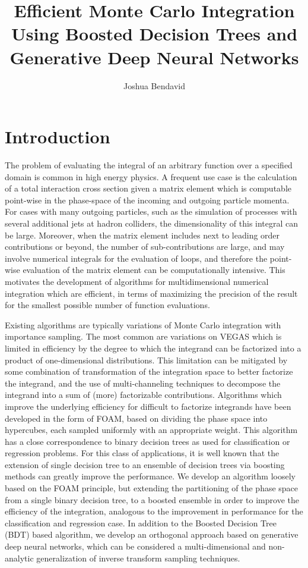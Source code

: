 \documentclass[a4paper,11pt]{article}
\title{Efficient Monte Carlo Integration Using Boosted Decision Trees and Generative Deep Neural Networks}
\author{Joshua Bendavid}
\affiliation{Lauritsen Laboratory for High Energy Physics, California Institute of Technology}
\begin{document}
\maketitle
\flushbottom

\section{Introduction}
The problem of evaluating the integral of an arbitrary function over a specified domain is common in high energy physics.  A frequent use case is the calculation of a total interaction cross section given a matrix element which is computable point-wise in the phase-space of the incoming and outgoing particle momenta.  For cases with many outgoing particles, such as the simulation of processes with several additional jets at hadron colliders, the dimensionality of this integral can be large.  Moreover, when the matrix element includes next to leading order contributions or beyond, the number of sub-contributions are large, and may involve numerical integrals for the evaluation of loops, and therefore the point-wise evaluation of the matrix element can be computationally intensive.  This motivates the development of algorithms for multidimensional numerical integration which are efficient, in terms of maximizing the precision of the result for the smallest possible number of function evaluations.

Existing algorithms are typically variations of Monte Carlo integration with importance sampling.  The most common are variations on VEGAS\cite{vegas} which is limited in efficiency by the degree to which the integrand can be factorized into a product of one-dimensional distributions.  This limitation can be mitigated by some combination of transformation of the integration space to better factorize the integrand, and the use of multi-channeling techniques to decompose the integrand into a sum of (more) factorizable contributions\cite{vamp}.  Algorithms which improve the underlying efficiency for difficult to factorize integrands have been developed in the form of FOAM\cite{foam}, based on dividing the phase space into hypercubes, each sampled uniformly with an appropriate weight.  This algorithm has a close correspondence to binary decision trees as used for classification or regression problems.  For this class of applications, it is well known that the extension of single decision tree to an ensemble of decision trees via boosting methods can greatly improve the performance\cite{Friedman98additivelogistic,Friedman00greedyfunction}.  We develop an algorithm loosely based on the FOAM principle, but extending the partitioning of the phase space from a single binary decision tree, to a boosted ensemble in order to improve the efficiency of the integration, analogous to the improvement in performance for the classification and regression case.  In addition to the Boosted Decision Tree (BDT) based algorithm, we develop an orthogonal approach based on generative deep neural networks, which can be considered a multi-dimensional and non-analytic generalization of inverse transform sampling techniques.
\end{document}
